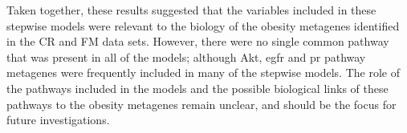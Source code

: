 Taken together, these results suggested that the variables included in these stepwise models were relevant to the biology of the obesity metagenes identified in the CR and FM data sets.
However, there were no single common pathway that was present in all of the models; although Akt, \gls{egfr} and \gls{pr} pathway metagenes were frequently included in many of the stepwise models.
The role of the pathways included in the models and the possible biological links of these pathways to the obesity metagenes remain unclear, and should be the focus for future investigations.

